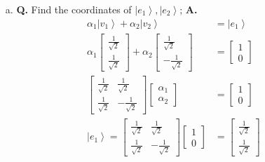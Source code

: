 \documentclass[main.tex]{subfiles}
\begin{document}
\begin{enumerate}
    \begin{enumerate}
        \item[a.] \textbf{Q.} Find the coordinates of $\left|e_{1}\right\rangle,\left|e_{2}\right\rangle$; \textbf{A.}
        \begin{align*}
            \alpha_{1}\left|v_{1}\right\rangle+\alpha_{2}\left|v_{2}\right\rangle                               & = \left|e_{1}\right\rangle\\
            \alpha_{1} \left[\begin{array}{l} \frac{1}{\sqrt{2}} \\ \frac{1}{\sqrt{2}} \end{array}\right]
            + \alpha_{2} \left[\begin{array}{l} \frac{1}{\sqrt{2}} \\ -\frac{1}{\sqrt{2}} \end{array}\right]    & = \left[\begin{array}{l} 1 \\ 0 \end{array}\right]\\
            \left[\begin{array}{ll} \frac{1}{\sqrt{2}} & \frac{1}{\sqrt{2}} 
            \\ \frac{1}{\sqrt{2}} & -\frac{1}{\sqrt{2}} \end{array}\right]
            \left[\begin{array}{c} \alpha_{1} \\ \alpha_{2} \end{array}\right]                                  & = \left[\begin{array}{c} 1 \\ 0 \end{array}\right] \tag{matrix is unitary, inverse is the adjoint} \\
            \left|e_{1}\right\rangle = 
            \left[\begin{array}{ll} \frac{1}{\sqrt{2}} & \frac{1}{\sqrt{2}} 
            \\ \frac{1}{\sqrt{2}} & -\frac{1}{\sqrt{2}} \end{array}\right]
            \left[\begin{array}{c} 1 \\ 0 \end{array}\right]                                                    & = \left[\begin{array}{c} \frac{1}{\sqrt{2}} \\ \frac{1}{\sqrt{2}} \end{array}\right] \tag{new basis}\\

\end{align*}
\end{enumerate}
\end{enumerate}
\end{document}
